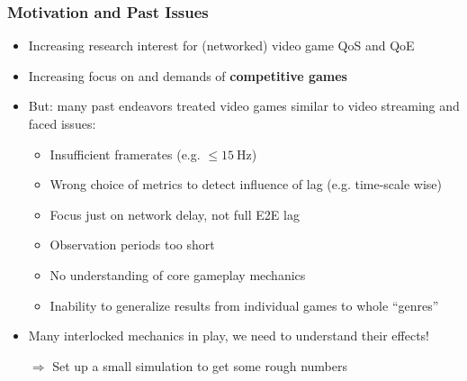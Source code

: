 \documentclass{UDEbeamerEN}
\begin{document}
\begin{frame}
	\frametitle{Motivation and Past Issues}

	\begin{itemize}
		\item Increasing research interest for (networked) video game QoS and QoE
		\item Increasing focus on and demands of \textbf{competitive games}
		\item But: many past endeavors treated video games similar to video streaming and faced issues:
			\pause
			\begin{itemize}
				\item Insufficient framerates (e.g. $\leq \SI{15}{\hertz}$)
				\item Wrong choice of metrics to detect influence of lag (e.g. time-scale wise)
				\item Focus just on network delay, not full E2E lag
				\item Observation periods too short
				\item No understanding of core gameplay mechanics
				\item Inability to generalize results from individual games to whole ``genres''
			\end{itemize}

		\pause
		\item Many interlocked mechanics in play, we need to understand their effects!
		\item[$\Rightarrow$] Set up a small simulation to get some rough numbers
	\end{itemize}

\end{frame}
\end{document}
